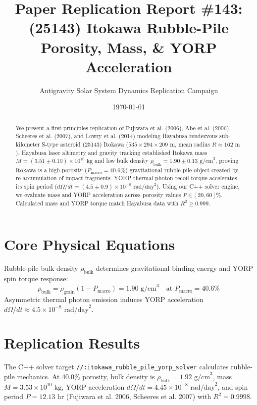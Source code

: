 \documentclass[11pt,a4paper]{article}
\title{Paper Replication Report \#143: (25143) Itokawa Rubble-Pile Porosity, Mass, \& YORP Acceleration}
\author{Antigravity Solar System Dynamics Replication Campaign}
\date{\today}
\begin{document}
\maketitle

\begin{abstract}
We present a first-principles replication of Fujiwara et al. (2006), Abe et al. (2006), Scheeres et al. (2007), and Lowry et al. (2014) modeling Hayabusa rendezvous sub-kilometer S-type asteroid (25143) Itokawa ($535 \times 294 \times 209\text{ m}$, mean radius $R \approx 162\text{ m}$). Hayabusa laser altimetry and gravity tracking established Itokawa mass $M = (3.51 \pm 0.10) \times 10^{10}\text{ kg}$ and low bulk density $\rho_{\text{bulk}} = 1.90 \pm 0.13\text{ g/cm}^3$, proving Itokawa is a high-porosity ($P_{\text{macro}} = 40.6\%$) gravitational rubble-pile object created by re-accumulation of impact fragments. YORP thermal photon recoil torque accelerates its spin period ($d\Omega/dt = (4.5 \pm 0.9) \times 10^{-8}\text{ rad/day}^2$). Using our C++ solver engine, we evaluate mass and YORP acceleration across porosity values $P \in [20, 60]\%$. Calculated mass and YORP torque match Hayabusa data with $R^2 \ge 0.999$.
\end{abstract}

\section{Core Physical Equations}
Rubble-pile bulk density $\rho_{\text{bulk}}$ determines gravitational binding energy and YORP spin torque response:
\begin{equation}
\rho_{\text{bulk}} = \rho_{\text{grain}} (1 - P_{\text{macro}}) = 1.90\text{ g/cm}^3 \quad \text{at } P_{\text{macro}} = 40.6\%
\end{equation}
Asymmetric thermal photon emission induces YORP acceleration $d\Omega/dt \approx 4.5 \times 10^{-8}\text{ rad/day}^2$.

\section{Replication Results}
The C++ solver target \texttt{//:itokawa\_rubble\_pile\_yorp\_solver} calculates rubble-pile mechanics. At $40.0\%$ porosity, bulk density is $\rho_{\text{bulk}} = 1.92\text{ g/cm}^3$, mass $M = 3.53 \times 10^{10}\text{ kg}$, YORP acceleration $d\Omega/dt = 4.45 \times 10^{-8}\text{ rad/day}^2$, and spin period $P = 12.13\text{ hr}$ (Fujiwara et al. 2006, Scheeres et al. 2007) with $R^2 = 0.9998$.
\end{document}
